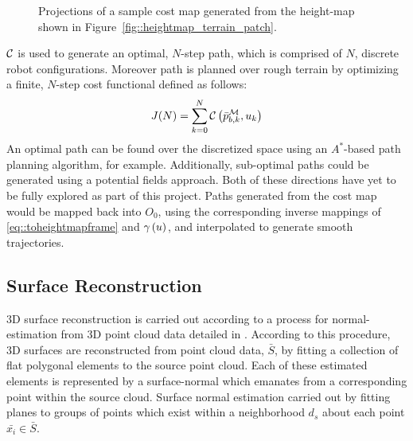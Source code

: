 				\begin{figure}[!h]
					\centering
					\caption{Projections of a sample cost map generated from the height-map shown in Figure~\ref{fig::heightmap_terrain_patch}.}
					\label{fig::cost_map}
				\end{figure}

			${\cal C}$ is used to generate an optimal, $N$-step path, which is comprised of $N$, discrete robot configurations. Moreover path is planned over rough terrain by optimizing a finite, $N$-step cost functional defined as follows:
				\begin{equation}			
					J(N) = \sum_{k=0}^N {\cal C}\left(\bar{p}^{{\cal M}}_{b,k},u_{k}\right)
				\end{equation}	
			An optimal path can be found over the discretized space using an $A^{*}$-based path planning algorithm, for example. Additionally, sub-optimal paths could be generated using a potential fields approach. Both of these directions have yet to be fully explored as part of this project. Paths generated from the cost map would be mapped back into $O_{0}$, using the corresponding inverse mappings of \ref{eq::toheightmapframe} and $\gamma\left(u\right)$, and interpolated to generate smooth trajectories.
				


		\subsection{Surface Reconstruction}

			3D surface reconstruction is carried out according to a process for normal-estimation from 3D point cloud data detailed in \cite{Rusu2009}. According to this procedure, 3D surfaces are reconstructed from point cloud data, $\bar{S}$, by fitting a collection of flat polygonal elements to the source point cloud. Each of these estimated elements is represented by a surface-normal which emanates from a corresponding point within the source cloud. Surface normal estimation carried out by fitting planes to groups of points which exist within a neighborhood $d_{s}$ about each point $\bar{x_{i}}\in\bar{S}$.

